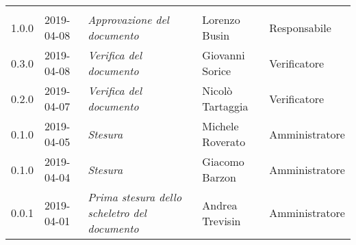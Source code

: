 \newpage 
\section*{}
\begin{longtable}{C{2cm}|C{2.5cm}|C{4.5cm}|C{2.5cm}|C{3cm}}
	
	 &  &  &  &   \\
	\endhead
	
	1.0.0 & 2019-04-08 &  \emph{Approvazione del documento} &  Lorenzo Busin & Responsabile\\
	\hline
	
	0.3.0 & 2019-04-08 & \emph{Verifica del documento} & Giovanni Sorice & Verificatore \\
	\hline
	
	0.2.0 & 2019-04-07 & \emph{Verifica del documento} & Nicolò Tartaggia & Verificatore \\
	\hline
	
	0.1.0 & 2019-04-05 & \emph{Stesura } & Michele Roverato & Amministratore \\
	\hline
	
	0.1.0 & 2019-04-04 & \emph{Stesura } & Giacomo Barzon & Amministratore \\
	\hline
	
	0.0.1 & 2019-04-01 & \emph{Prima stesura dello scheletro del documento} & Andrea Trevisin & Amministratore \\
	
\end{longtable}



\clearpage